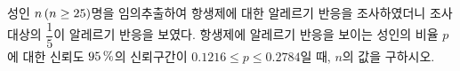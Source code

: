 성인 $n\mkern3mu (n\ge 25)$명을 임의추출하여 항생제에 대한 알레르기 반응을 조사하였더니 조사 대상의 $\dfrac{1}{5}$이 알레르기 반응을 보였다. 항생제에 알레르기 반응을 보이는 성인의 비율 $p$에 대한 신뢰도 $95\mkern3mu \%$의 신뢰구간이 $0.1216\le p\le 0.2784$일 때, $n$의 값을 구하시오. 
